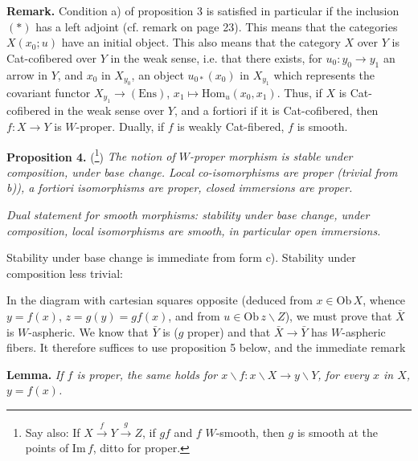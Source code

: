 \documentclass[11pt,leqno]{article}
\newcommand{\msp}[1]{\marginpar{\footnotesize [#1]}}
\newcommand{\Ob}{\mathrm{Ob}\,}
\begin{document}
\textbf{Remark.} Condition a) of proposition 3 is satisfied in particular if the inclusion $(*)$ has a left adjoint (cf. remark on page 23). This means that the categories $X(x_0;u)$ have an initial object. This also means that the category $X$ over $Y$ is Cat-cofibered over $Y$ in the weak sense, i.e. that there exists, for $u_0 : y_0 \longrightarrow y_1$ an arrow in $Y$, and $x_0$ in $X_{y_0}$, an object $u_{0*}(x_0)$ in $X_{y_1}$ which represents the covariant functor $X_{y_1} \longrightarrow (\mathrm{Ens})$, $x_1 \longmapsto \mathrm{Hom}_u(x_0, x_1)$. Thus, if $X$ is Cat-cofibered in the weak sense over $Y$, and a fortiori if it is Cat-cofibered, then $f : X \longrightarrow Y$ is $W$-proper. Dually, if $f$ is weakly Cat-fibered, $f$ is smooth.

\textbf{Proposition 4.} (\footnote[43]{Say also: If $X \xrightarrow{f} Y \xrightarrow{g} Z$, if $gf$ and $f$ $W$-smooth, then $g$ is smooth at the points of $\mathrm{Im}\, f$, ditto for proper.}) \textit{The notion of $W$-proper morphism is stable under composition, under base change. Local co-isomorphisms are proper (trivial from b)), a fortiori isomorphisms are proper, closed immersions are proper.}

\textit{Dual statement for smooth morphisms: stability under base change, under composition, local isomorphisms are smooth, in particular open immersions.}

\msp{page 29}Stability under base change is immediate from form c). Stability under composition less trivial:

\begin{center}
\end{center}

In the diagram with cartesian squares opposite (deduced from $x \in \Ob X$, whence $y = f(x)$, $z = g(y) = gf(x)$, and from $u \in \Ob z\backslash Z$), we must prove that $\bar{X}$ is $W$-aspheric. We know that $\bar{Y}$ is ($g$ proper) and that $\bar{X} \longrightarrow \bar{Y}$ has $W$-aspheric fibers. It therefore suffices to use proposition 5 below, and the immediate remark %

\textbf{Lemma.} \textit{If $f$ is proper, the same holds for $x\backslash f : x\backslash X \longrightarrow y\backslash Y$, for every $x$ in $X$, $y = f(x)$.}
\end{document}
